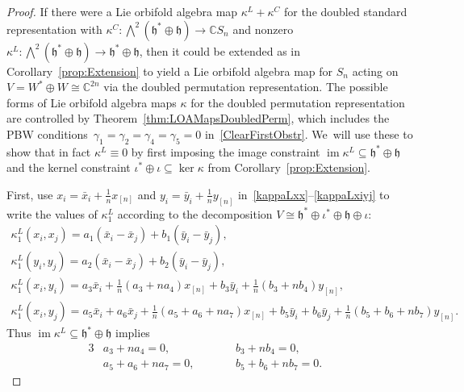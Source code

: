 \documentclass[10pt,a4paper]{amsart}
\numberwithin{equation}{section}
\newcommand{\n}[1]{{#1}_{[n]}}
\DeclareMathOperator{\im}{im}
\begin{document}
\begin{proof}
If there were a Lie orbifold algebra map $\kappa^L+\kappa^C$ for the
doubled standard representation with $\kappa^C\colon \bigwedge^2 (\mathfrak{h}^*\oplus\mathfrak{h}) \to \mathbb{C} S_n$
and nonzero $\kappa^L\colon \bigwedge^2 (\mathfrak{h}^*\oplus\mathfrak{h}) \to \mathfrak{h}^*\oplus\mathfrak{h}$, then
it could be extended as in Corollary~\ref{prop:Extension} to yield a
Lie orbifold algebra map for $S_n$ acting on $V=W^* \oplus W \cong \mathbb{C}^{2n}$ via
the doubled permutation representation. The possible forms of Lie orbifold algebra maps
$\kappa$ for the doubled permutation representation are controlled by Theorem~\ref{thm:LOAMapsDoubledPerm}, which includes the PBW conditions~$\gamma_1=\gamma_2=\gamma_4=\gamma_5=0$ in~\eqref{ClearFirstObstr}. We~will use these to show that in fact $\kappa^L\equiv 0$
by first imposing the image constraint $\im \kappa^L \subseteq \mathfrak{h}^*\oplus\mathfrak{h}$ and the kernel constraint $\iota^*\oplus\iota\subseteq\ker\kappa$
from Corollary~\ref{prop:Extension}.

First, use
$x_i=\bar{x}_i+\tfrac{1}{n}x_{[n]}$ and $y_i=\bar{y}_i+\tfrac{1}{n}y_{[n]}$
in~\eqref{kappaLxx}--\eqref{kappaLxiyj} to write the values of $\kappa^L_1$
according to the decomposition $V\cong\mathfrak{h}^* \oplus \iota^* \oplus \mathfrak{h} \oplus \iota$:
\begin{gather*}
\kappa^L_1(x_i,x_j)=a_1(\bar{x}_i-\bar{x}_j)+b_1(\bar{y}_i-\bar{y}_j), \\
\kappa^L_1(y_i,y_j)=a_2(\bar{x}_i-\bar{x}_j)+b_2(\bar{y}_i-\bar{y}_j), \\
\kappa^L_1(x_i,y_i)=a_3\bar{x}_i+\frac{1}{n}(a_3+na_4)\n{x}+b_3 \bar{y}_i+\frac{1}{n}(b_3+nb_4)\n{y}, \\
\kappa^L_1(x_i,y_j)=a_5 \bar{x}_i+a_6 \bar{x}_j+\frac{1}{n}(a_5+a_6+na_7)\n{x}+b_5 \bar{y}_i+b_6 \bar{y}_j+\frac{1}{n}(b_5+b_6+nb_7)\n{y}.
\end{gather*}
Thus $\im \kappa^L \subseteq \mathfrak{h}^*\oplus\mathfrak{h}$ implies
\begin{alignat*}{3}
& a_3+na_4=0, \qquad && b_3+nb_4=0,& \\
&a_5+a_6+na_7=0, \qquad && b_5+b_6+nb_7=0.&
\end{alignat*}


\end{proof}
\end{document}
